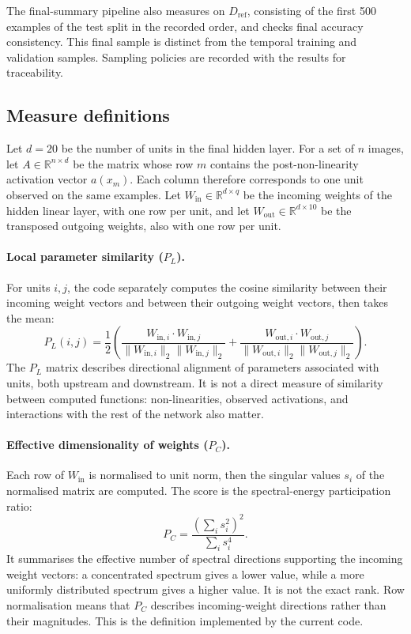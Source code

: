 \documentclass[11pt,a4paper]{article}
\begin{document}
The final-summary pipeline also measures on $D_{\mathrm{ref}}$, consisting of the first 500 examples of the test split in the recorded order, and checks final accuracy consistency. This final sample is distinct from the temporal training and validation samples. Sampling policies are recorded with the results for traceability.

\subsection{Measure definitions}

Let $d=20$ be the number of units in the final hidden layer. For a set of $n$ images, let $A\in\mathbb{R}^{n\times d}$ be the matrix whose row $m$ contains the post-non-linearity activation vector $a(x_m)$. Each column therefore corresponds to one unit observed on the same examples. Let $W_{\mathrm{in}}\in\mathbb{R}^{d\times q}$ be the incoming weights of the hidden linear layer, with one row per unit, and let $W_{\mathrm{out}}\in\mathbb{R}^{d\times 10}$ be the transposed outgoing weights, also with one row per unit.

\paragraph{Local parameter similarity ($P_L$).}
For units $i,j$, the code separately computes the cosine similarity between their incoming weight vectors and between their outgoing weight vectors, then takes the mean:
\[
 P_L(i,j)=\frac{1}{2}\left(
 \frac{W_{\mathrm{in},i}\cdot W_{\mathrm{in},j}}
 {\|W_{\mathrm{in},i}\|_2\|W_{\mathrm{in},j}\|_2}
 +
 \frac{W_{\mathrm{out},i}\cdot W_{\mathrm{out},j}}
 {\|W_{\mathrm{out},i}\|_2\|W_{\mathrm{out},j}\|_2}
 \right).
\]
The $P_L$ matrix describes directional alignment of parameters associated with units, both upstream and downstream. It is not a direct measure of similarity between computed functions: non-linearities, observed activations, and interactions with the rest of the network also matter.

\paragraph{Effective dimensionality of weights ($P_C$).}
Each row of $W_{\mathrm{in}}$ is normalised to unit norm, then the singular values $s_i$ of the normalised matrix are computed. The score is the spectral-energy participation ratio:
\[
 P_C=\frac{\left(\sum_i s_i^2\right)^2}{\sum_i s_i^4}.
\]
It summarises the effective number of spectral directions supporting the incoming weight vectors: a concentrated spectrum gives a lower value, while a more uniformly distributed spectrum gives a higher value. It is not the exact rank. Row normalisation means that $P_C$ describes incoming-weight directions rather than their magnitudes. This is the definition implemented by the current code.
\end{document}
